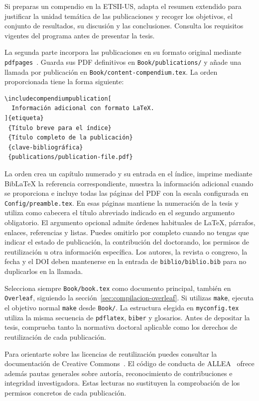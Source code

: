 Si preparas un compendio en la ETSII-US, adapta el resumen extendido para justificar la unidad temática de las publicaciones y recoger los objetivos, el conjunto de resultados, su discusión y las conclusiones. Consulta los requisitos vigentes del programa antes de presentar la tesis.

La segunda parte incorpora las publicaciones en su formato original mediante \texttt{pdfpages}~\cite{pdfpages-manual}. Guarda sus PDF definitivos en \texttt{Book/publications/} y añade una llamada por publicación en \texttt{Book/content-compendium.tex}. La orden proporcionada tiene la forma siguiente:

\begin{verbatim}
\includecompendiumpublication[
  Información adicional con formato LaTeX.
]{etiqueta}
 {Título breve para el índice}
 {Título completo de la publicación}
 {clave-bibliográfica}
 {publications/publication-file.pdf}
\end{verbatim}

La orden crea un capítulo numerado y su entrada en el índice, imprime mediante BibLaTeX la referencia correspondiente, muestra la información adicional cuando se proporciona e incluye todas las páginas del PDF con la escala configurada en \texttt{Config/preamble.tex}. En esas páginas mantiene la numeración de la tesis y utiliza como cabecera el título abreviado indicado en el segundo argumento obligatorio. El argumento opcional admite órdenes habituales de \LaTeX{}, párrafos, enlaces, referencias y listas. Puedes omitirlo por completo cuando no tengas que indicar el estado de publicación, la contribución del doctorando, los permisos de reutilización u otra información específica. Los autores, la revista o congreso, la fecha y el DOI deben mantenerse en la entrada de \texttt{biblio/biblio.bib} para no duplicarlos en la llamada.

Selecciona siempre \texttt{Book/book.tex} como documento principal, también en \texttt{Overleaf}, siguiendo la sección~\ref{sec:compilacion-overleaf}. Si utilizas \texttt{make}, ejecuta el objetivo normal \texttt{make} desde \texttt{Book/}. La estructura elegida en \texttt{myconfig.tex} utiliza la misma secuencia de \texttt{pdflatex}, \texttt{biber} y glosarios. Antes de depositar la tesis, comprueba tanto la normativa doctoral aplicable como los derechos de reutilización de cada publicación.

Para orientarte sobre las licencias de reutilización puedes consultar la documentación de Creative Commons~\cite{creativecommons-licenses}. El código de conducta de ALLEA~\cite{allea2023integrity} ofrece además pautas generales sobre autoría, reconocimiento de contribuciones e integridad investigadora. Estas lecturas no sustituyen la comprobación de los permisos concretos de cada publicación.

